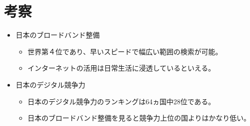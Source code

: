 \documentclass[a4paper,11pt,dvipdfmx]{ujarticle}
\begin{document}
\section{考察}
%
\begin{itemize}
    \item 日本のブロードバンド整備
    \begin{itemize}
        \item 世界第４位であり、早いスピードで幅広い範囲の検索が可能。
        \item インターネットの活用は日常生活に浸透しているといえる。
    \end{itemize}
\end{itemize}
\begin{itemize}
    \item 日本のデジタル競争力
    \begin{itemize}
        \item 日本のデジタル競争力のランキングは64ヵ国中28位である。
        \item 日本のブロードバンド整備を見ると競争力上位の国よりはかなり低い。
        
         
    \end{itemize}
\end{itemize}

%


\end{document}
